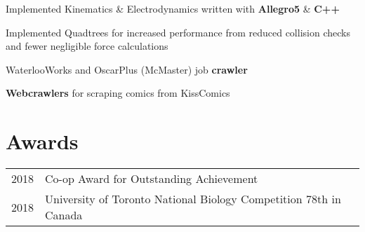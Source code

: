 \documentclass[]{chandan-cv}
\begin{document}
\begin{minipage}[t]{0.71\textwidth}
\descript{ }
\location{ }
\begin{tightemize}
        \item Implemented Kinematics \& Electrodynamics written with \textbf{Allegro5} \& \textbf{C++}
        \item Implemented Quadtrees for increased performance from reduced collision checks and fewer negligible force calculations
	\item WaterlooWorks and OscarPlus (McMaster) job \textbf{crawler}
	\item \textbf{Webcrawlers} for scraping comics from KissComics
\end{tightemize}
\sectionsep


\section{Awards}
\begin{tabular}{rll}
2018		&	Co-op Award for Outstanding Achievement\\
2018		&	University of Toronto National Biology Competition 78th in Canada\\
\end{tabular}
\sectionsep

%
%

\end{minipage}
\end{document}
